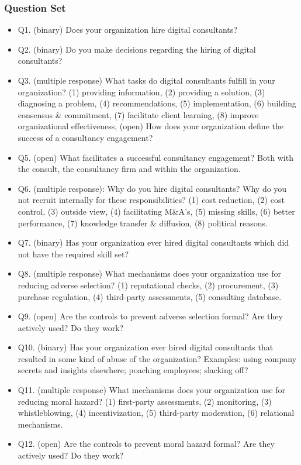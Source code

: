 \documentclass[
  man,floatsintext]{apa6}
\begin{document}
\subsubsection{Question Set}\label{question-set}

\begin{itemize}
\item
  Q1. (binary) Does your organization hire digital consultants?
\item
  Q2. (binary) Do you make decisions regarding the hiring of digital consultants?
\item
  Q3. (multiple response) What tasks do digital consultants fulfill in your organization? (1) providing information, (2) providing a solution, (3) diagnosing a problem, (4) recommendations, (5) implementation, (6) building consensus \& commitment, (7) facilitate client learning, (8) improve organizational effectiveness, (open) How does your organization define the success of a consultancy engagement?
\item
  Q5. (open) What facilitates a successful consultancy engagement? Both with the consult, the consultancy firm and within the organization.
\item
  Q6. (multiple response): Why do you hire digital consultants? Why do you not recruit internally for these responsibilities? (1) cost reduction, (2) cost control, (3) outside view, (4) facilitating M\&A's, (5) missing skills, (6) better performance, (7) knowledge transfer \& diffusion, (8) political reasons.
\item
  Q7. (binary) Has your organization ever hired digital consultants which did not have the required skill set?
\item
  Q8. (multiple response) What mechanisms does your organization use for reducing adverse selection? (1) reputational checks, (2) procurement, (3) purchase regulation, (4) third-party assessments, (5) consulting database.
\item
  Q9. (open) Are the controls to prevent adverse selection formal? Are they actively used? Do they work?
\item
  Q10. (binary) Has your organization ever hired digital consultants that resulted in some kind of abuse of the organization? Examples: using company secrets and insights elsewhere; poaching employees; slacking off?
\item
  Q11. (multiple response) What mechanisms does your organization use for reducing moral hazard? (1) first-party assessments, (2) monitoring, (3) whistleblowing, (4) incentivization, (5) third-party moderation, (6) relational mechanisms.
\item
  Q12. (open) Are the controls to prevent moral hazard formal? Are they actively used? Do they work?
\end{itemize}
\end{document}
